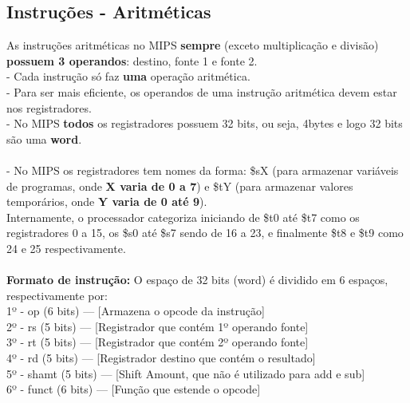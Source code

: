 \documentclass[12pt]{article}
\begin{document}
    \subsection{Instruções - Aritméticas}
    As instruções aritméticas no MIPS \textbf{sempre} (exceto multiplicação e divisão) \textbf{possuem 3 operandos}: destino, fonte 1 e fonte 2.
    \\- Cada instrução só faz \textbf{uma} operação aritmética.
    \\- Para ser mais eficiente, os operandos de uma instrução aritmética devem estar nos registradores.
    \\- No MIPS \textbf{todos} os registradores possuem 32 bits, ou seja, 4bytes e logo 32 bits são uma \textbf{word}.
    \\~\\- No MIPS os registradores tem nomes da forma: \$sX (para armazenar variáveis de programas, onde \textbf{X varia de 0 a 7}) e \$tY (para armazenar valores temporários, onde \textbf{Y varia de 0 até 9}).
    \\Internamente, o processador categoriza iniciando de \$t0 até \$t7 como os registradores 0 a 15, os \$s0 até \$s7 sendo de 16 a 23, e finalmente \$t8 e \$t9 como 24 e 25 respectivamente.
    \\~\\\textbf{Formato de instrução:} O espaço de 32 bits (word) é dividido em 6 espaços, respectivamente por:
    \\1º - op (6 bits) --- [Armazena o opcode da instrução]
    \\2º - rs (5 bits) --- [Registrador que contém 1º operando fonte]
    \\3º - rt (5 bits) --- [Registrador que contém 2º operando fonte]
    \\4º - rd (5 bits)  --- [Registrador destino que contém o resultado]
    \\5º - shamt (5 bits)  --- [Shift Amount, que não é utilizado para add e sub]
    \\6º - funct (6 bits) --- [Função que estende o opcode]
    

\end{document}
